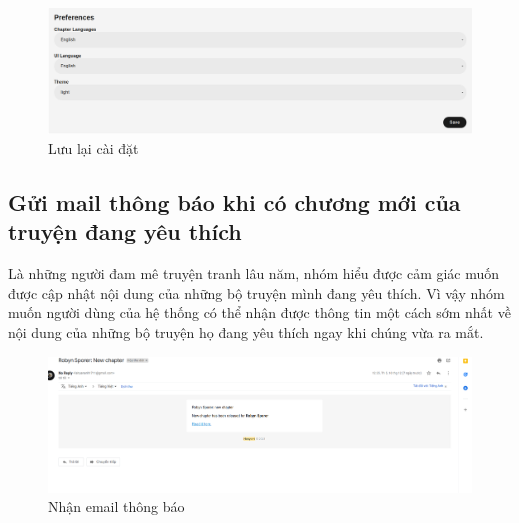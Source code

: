 \documentclass[./../main.tex]{subfiles}
\begin{document}
\begin{figure}[!htb]
	\centering
	\includegraphics[width=\linewidth]{./images/setting.png}
	\caption{Lưu lại cài đặt}
\end{figure}

\subsection{Gửi mail thông báo khi có chương mới của truyện đang yêu thích}
Là những người đam mê truyện tranh lâu năm, nhóm hiểu được cảm giác muốn được cập nhật nội dung của những bộ truyện mình đang yêu thích. Vì vậy nhóm muốn người dùng của hệ thống có thể nhận được thông tin một cách sớm nhất về nội dung của những bộ truyện họ đang yêu thích ngay khi chúng vừa ra mắt.


\begin{figure}[!htb]
	\centering
	\includegraphics[width=\linewidth]{./images/email.png}
	\caption{Nhận email thông báo}
\end{figure}
\end{document}
